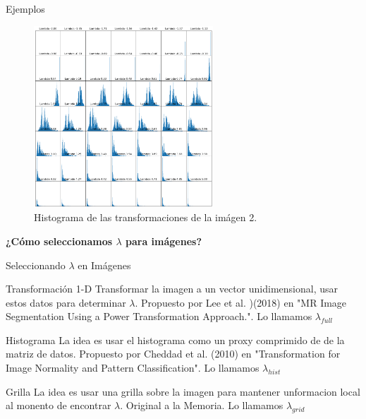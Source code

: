 \documentclass{beamer}
\begin{document}
\begin{frame}{Ejemplos}
    \begin{figure}
        \centering
        \includegraphics[width=0.6\textwidth]{all_lambda_hist_3.png}
        \caption{Histograma de las transformaciones de la im\'agen 2.}
        \label{fig:img_bci_hist_2}
    \end{figure}
\end{frame}

\begin{frame}
    \begin{center}
        {\LARGE\bf ¿Cómo seleccionamos $\lambda$ para imágenes?}
    \end{center}
\end{frame}

\begin{frame}{Seleccionando $\lambda$ en Im\'agenes}
    \begin{block}{Transformación 1-D}
        Transformar la imagen a un vector unidimensional, usar estos datos para determinar $\lambda$. Propuesto por Lee et al. )(2018) en "MR Image Segmentation Using a Power Transformation Approach.". Lo llamamos $\lambda_{full}$
    \end{block}
    
    \begin{block}{Histograma}
        La idea es usar el histograma como un proxy comprimido de de la matriz de datos. Propuesto por Cheddad et al. (2010) en "Transformation for Image Normality and Pattern Classification". Lo llamamos $\lambda_{hist}$
    \end{block}
    
    \begin{block}{Grilla}
        La idea es usar una grilla sobre la imagen para mantener unformacion local al monento de encontrar $\lambda$. Original a la Memoria. Lo llamamos $\lambda_{grid}$
    \end{block}

\end{frame}
\end{document}

